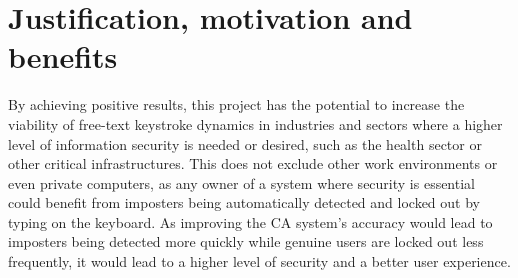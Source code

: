\documentclass[informationsecurity]{gucmasterproject}
\begin{document}



%

\section{Justification, motivation and benefits}

By achieving positive results, this project has the potential to increase the viability of free-text keystroke dynamics in industries and sectors where a higher level of information security is needed or desired, such as the health sector or other critical infrastructures.
This does not exclude other work environments or even private computers, as any owner of a system where security is essential could benefit from imposters being automatically detected and locked out by typing on the keyboard.
As improving the CA system's accuracy would lead to imposters being detected more quickly while genuine users are locked out less frequently, it would lead to a higher level of security and a better user experience.
\end{document}
